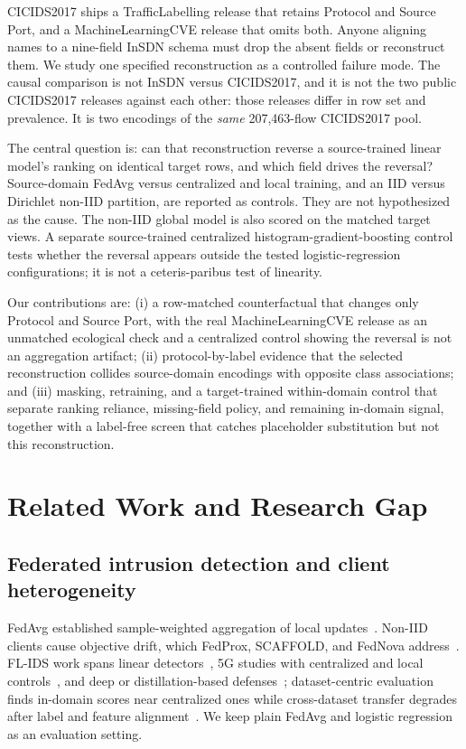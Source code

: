 \documentclass[conference,a4paper]{IEEEtran}
\begin{document}
CICIDS2017 ships a TrafficLabelling release that retains Protocol and Source Port, and a MachineLearningCVE release that omits both. Anyone aligning names to a nine-field InSDN schema must drop the absent fields or reconstruct them. We study one specified reconstruction as a controlled failure mode. The causal comparison is not InSDN versus CICIDS2017, and it is not the two public CICIDS2017 releases against each other: those releases differ in row set and prevalence. It is two encodings of the \emph{same} 207,463-flow CICIDS2017 pool.

The central question is: can that reconstruction reverse a source-trained linear model's ranking on identical target rows, and which field drives the reversal? Source-domain FedAvg versus centralized and local training, and an IID versus Dirichlet non-IID partition, are reported as controls. They are not hypothesized as the cause. The non-IID global model is also scored on the matched target views. A separate source-trained centralized histogram-gradient-boosting control tests whether the reversal appears outside the tested logistic-regression configurations; it is not a ceteris-paribus test of linearity.

Our contributions are: (i) a row-matched counterfactual that changes only Protocol and Source Port, with the real MachineLearningCVE release as an unmatched ecological check and a centralized control showing the reversal is not an aggregation artifact; (ii) protocol-by-label evidence that the selected reconstruction collides source-domain encodings with opposite class associations; and (iii) masking, retraining, and a target-trained within-domain control that separate ranking reliance, missing-field policy, and remaining in-domain signal, together with a label-free screen that catches placeholder substitution but not this reconstruction.

\section{Related Work and Research Gap}
\subsection{Federated intrusion detection and client heterogeneity}
FedAvg established sample-weighted aggregation of local updates~\cite{fedavg}. Non-IID clients cause objective drift, which FedProx, SCAFFOLD, and FedNova address~\cite{fedprox,scaffold,fednova}. FL-IDS work spans linear detectors~\cite{scanfl}, 5G studies with centralized and local controls~\cite{fiveg}, and deep or distillation-based defenses~\cite{flreview,fedkd}; dataset-centric evaluation finds in-domain scores near centralized ones while cross-dataset transfer degrades after label and feature alignment~\cite{datasetcentric}. We keep plain FedAvg and logistic regression as an evaluation setting.
\end{document}
